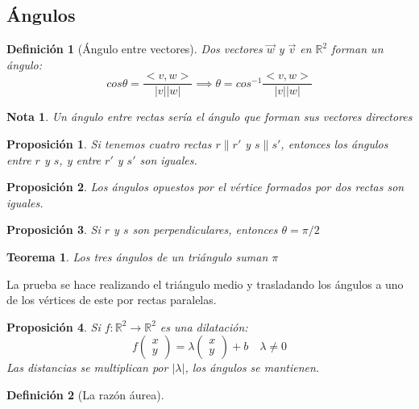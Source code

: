 \documentclass[11pt, a4paper, titlepage]{article}
\makeatletter
\renewenvironment{proof}[1][\proofname] {\vspace{-15pt}\par\pushQED{\qed}\normalfont\topsep6\p@\@plus6\p@\relax\trivlist\item[\hskip\labelsep\it#1\@addpunct{.}]\ignorespaces}{\popQED\endtrivlist\@endpefalse}
\newcommand{\R}{\mathbb{R}}
\renewcommand{\vec}{\overrightarrow}
\theoremstyle{theorem-style}
\newtheorem*{nth}{Teorema}
\newtheorem*{nprop}{Proposición}
\theoremstyle{definition-style}
\newtheorem*{ndef}{Definición}
\theoremstyle{remark-style}
\newtheorem*{nota}{Nota}
\theoremstyle{example-style}
\makeatother
\begin{document}
\subsection{Ángulos}

\begin{ndef}[Ángulo entre vectores]
  Dos vectores $\vec{w}$ y $\vec{v}$ en $\R^2$ forman un ángulo:
  \[
    cos \theta =  \frac{< v,w >}{|v||w|} \implies \theta = cos^{-1} \frac{< v,w >}{|v||w|}
  \]
\end{ndef}
\begin{nota}
  Un ángulo entre rectas sería el ángulo que forman sus vectores directores
\end{nota}
\begin{nprop}
  Si tenemos cuatro rectas $r \parallel r'$ y $s \parallel s'$, entonces los ángulos entre $r$ y $s$, y entre $r'$ y $s'$ son iguales.
\end{nprop}

\begin{nprop}
  Los ángulos opuestos por el vértice formados por dos rectas son iguales.
\end{nprop}

\begin{nprop}
  Si $r$ y $s$ son perpendiculares, entonces $\theta = \pi/2$
\end{nprop}

\begin{nth}
  Los tres ángulos de un triángulo suman $\pi$
\end{nth}
\begin{proof}
  La prueba se hace realizando el triángulo medio y trasladando los ángulos a uno de los vértices de este por rectas paralelas.
\end{proof}

\begin{nprop}
  Si $f:\R^2 \to \R^2$ es una dilatación:
  \[
    f \begin{pmatrix}
      x\\
      y 
    \end{pmatrix} = \lambda\begin{pmatrix}
      x\\
      y 
    \end{pmatrix} + b \quad \lambda \ne 0
  \]
  Las distancias se multiplican por $|\lambda|$, los ángulos se mantienen.
\end{nprop}

\begin{ndef}[La razón áurea]
  
\end{ndef}
\end{document}
